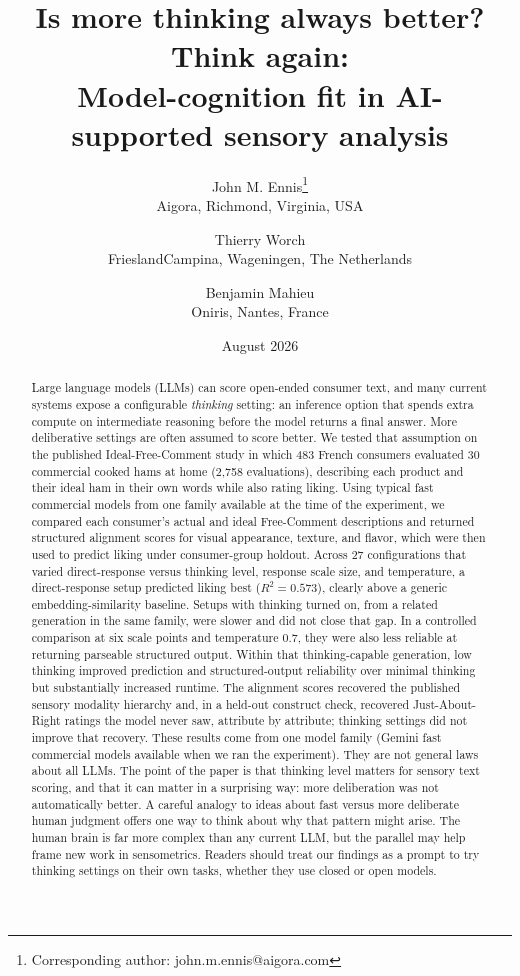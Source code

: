 \documentclass[11pt]{article}
\title{Is more thinking always better? Think again:\\
Model-cognition fit in AI-supported sensory analysis}
\author{
John M. Ennis\thanks{Corresponding author: john.m.ennis@aigora.com}\\
Aigora, Richmond, Virginia, USA
\and
Thierry Worch\\
FrieslandCampina, Wageningen, The Netherlands
\and
Benjamin Mahieu\\
Oniris, Nantes, France
}
\date{August 2026}
\begin{document}
\linenumbers
\maketitle

\begin{abstract}
Large language models (LLMs) can score open-ended consumer text, and many
current systems expose a configurable \emph{thinking} setting: an inference
option that spends extra compute on intermediate reasoning before the model
returns a final answer. More deliberative settings are often assumed to score
better. We tested that assumption on the published Ideal-Free-Comment study in
which 483 French consumers evaluated 30 commercial cooked hams at home (2,758
evaluations), describing each product and their ideal ham in their own words
while also rating liking. Using typical fast commercial models from one family
available at the time of the experiment,
we compared each consumer's actual and ideal Free-Comment descriptions and
returned structured alignment scores for visual appearance, texture, and
flavor, which were then used to predict liking under consumer-group holdout.
Across 27 configurations that varied direct-response versus thinking level,
response scale size, and temperature, a direct-response setup predicted liking
best ($R^2 = 0.573$), clearly above a generic embedding-similarity baseline.
Setups with thinking turned on, from a related generation in the same family,
were slower and did not close that gap. In a controlled comparison at six scale
points and temperature 0.7, they were also less reliable at returning parseable
structured output. Within that thinking-capable generation, low thinking
improved prediction and structured-output reliability over minimal thinking
but substantially increased runtime. The alignment scores recovered the
published sensory modality hierarchy and, in a held-out construct check,
recovered Just-About-Right ratings the model never saw, attribute by
attribute; thinking settings did not improve that recovery. These results
come from one model family (Gemini fast commercial models available when we
ran the experiment). They are not general laws about all LLMs. The point of
the paper is that thinking level matters for sensory text scoring, and that it
can matter in a surprising way: more deliberation was not automatically
better. A careful analogy to ideas about fast versus more deliberate human
judgment offers one way to think about why that pattern might arise. The
human brain is far more complex than any current LLM, but the parallel may
help frame new work in sensometrics. Readers should treat our findings as a
prompt to try thinking settings on their own tasks, whether they use closed
or open models.
\end{abstract}
\end{document}
